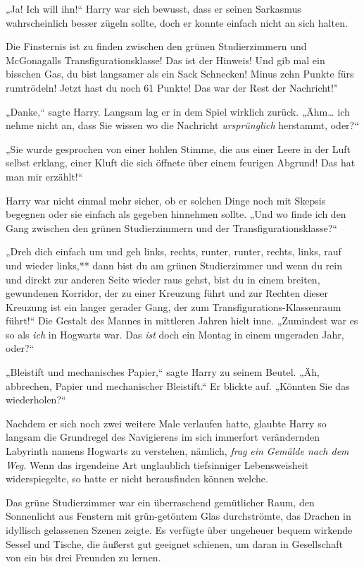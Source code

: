 {„Ja! Ich will ihn!“ Harry war sich bewusst, dass er seinen Sarkasmus wahrscheinlich besser zügeln sollte, doch er konnte einfach nicht an sich halten.

Die Finsternis ist zu finden zwischen den grünen Studierzimmern und McGonagalls Transfigurationsklasse! Das ist der Hinweis! Und gib mal ein bisschen Gas, du bist langsamer als ein Sack Schnecken! Minus zehn Punkte fürs rumtrödeln! Jetzt hast du noch 61 Punkte! Das war der Rest der Nachricht!"

„Danke,“ sagte Harry. Langsam lag er in dem Spiel wirklich zurück. „Ähm… ich nehme nicht an, dass Sie wissen wo die Nachricht \emph{ursprünglich} herstammt, oder?“

„Sie wurde gesprochen von einer hohlen Stimme, die aus einer Leere in der Luft selbst erklang, einer Kluft die sich öffnete über einem feurigen Abgrund! Das hat man mir erzählt!“

Harry war nicht einmal mehr sicher, ob er solchen Dinge noch mit Skepsis begegnen oder sie einfach als gegeben hinnehmen sollte. „Und wo finde ich den Gang zwischen den grünen Studierzimmern und der Transfigurationsklasse?“

„Dreh dich einfach um und geh links, rechts, runter, runter, rechts, links, rauf und wieder links,** dann bist du am grünen Studierzimmer und wenn du rein und direkt zur anderen Seite wieder raus gehst, bist du in einem breiten, gewundenen Korridor, der zu einer Kreuzung führt und zur Rechten dieser Kreuzung ist ein langer gerader Gang, der zum Transfigurations-Klassenraum führt!“ Die Gestalt des Mannes in mittleren Jahren hielt inne. „Zumindest war es so als \emph{ich} in Hogwarts war. Das \emph{ist} doch ein Montag in einem ungeraden Jahr, oder?“

„Bleistift und mechanisches Papier,“ sagte Harry zu seinem Beutel. „Äh, abbrechen, Papier und mechanischer Bleistift.“ Er blickte auf. „Könnten Sie das wiederholen?“

Nachdem er sich noch zwei weitere Male verlaufen hatte, glaubte Harry so langsam die Grundregel des Navigierens im sich immerfort verändernden Labyrinth namens Hogwarts zu verstehen, nämlich, \emph{frag} \emph{ein Gemälde nach dem Weg.} Wenn das irgendeine Art unglaublich tiefsinniger Lebensweisheit widerspiegelte, so hatte er nicht herausfinden können welche.

Das grüne Studierzimmer war ein überraschend gemütlicher Raum, den Sonnenlicht aus Fenstern mit grün-getöntem Glas durchströmte, das Drachen in idyllisch gelassenen Szenen zeigte. Es verfügte über ungeheuer bequem wirkende Sessel und Tische, die äußerst gut geeignet schienen, um daran in Gesellschaft von ein bis drei Freunden zu lernen.

}
